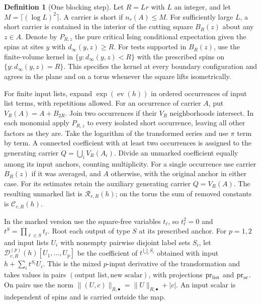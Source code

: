 \documentclass[11pt]{article}
\theoremstyle{definition}
\newtheorem{definition}[proposition]{Definition}
\begin{document}
\begin{definition}[One blocking step]
\label{def:blocking-map}
Let \(R=Lr\) with \(L\) an integer, and let
\(M=\lceil(\log L)^2\rceil\). A carrier is short if \(n_r(A)\le M\).
For sufficiently large \(L\), a short carrier is contained in
the interior of the cutting square \(B_R(z)\) about any
\(z\in A\). Denote by \(P_{R,z}\) the pure critical Ising
conditional expectation given the spins at sites \(y\) with
\(d_\infty(y,z)\ge R\). For tests supported in \(B_R(z)\),
use the finite-volume kernel in \(\{y:d_\infty(y,z)<R\}\)
with the prescribed spins on \(\{y:d_\infty(y,z)=R\}\).
This specifies the kernel at every boundary configuration and
agrees in the plane and on a torus whenever the square lifts
isometrically.

For finite input lists, expand \(\exp(\operatorname{ev}(h))\)
in ordered occurrences of input list terms, with repetitions
allowed. For an occurrence of carrier \(A\), put \(V_R(A)=A+B_{2R}\).
Join two occurrences if their \(V_R\) neighborhoods intersect.
In each monomial apply \(P_{R,z}\) to every isolated short
occurrence, leaving all other factors as they are. Take the
logarithm of the transformed series and use \(\pi\) term by term.
A connected coefficient with at least two occurrences is
assigned to the generating carrier \(Q=\bigcup_i V_R(A_i)\).
Divide an unmarked coefficient equally among its input anchors,
counting multiplicity. For a single occurrence use carrier
\(B_R(z)\) if it was averaged, and \(A\) otherwise, with the
original anchor in either case. For its estimates retain the
auxiliary generating carrier \(Q=V_R(A)\). The resulting
unmarked list is \(\mathcal R_{r,R}(h)\); on the torus the sum
of removed constants is \(\mathcal C_{r,R}(h)\).

In the marked version use the square-free variables
\(t_\ell\), so \(t_\ell^2=0\) and \(t^S=\prod_{\ell\in S}t_\ell\).
Root each output of type \(S\) at its prescribed anchor.
For \(p=1,2\) and input lists \(U_i\) with nonempty pairwise
disjoint label sets \(S_i\), let
\(\mathcal D^{(p)}_{r,R}(h)[U_1,\dots,U_p]\) be the coefficient
of \(t^{\bigcup_i S_i}\) obtained with input
\(h+\sum_i t^{S_i}U_i\). This is the mixed \(p\)-input derivative
of the transformation and takes values in pairs
\((\text{output list},\text{new scalar})\), with projections
\(\operatorname{pr}_{\rm list}\) and \(\operatorname{pr}_{\rm sc}\).
On pairs use the norm
\(\|(U,c)\|_{R,\bullet}=\|U\|_{R,\bullet}+|c|\).
An input scalar is independent of spins and is carried outside
the map.
\end{definition}
\end{document}
